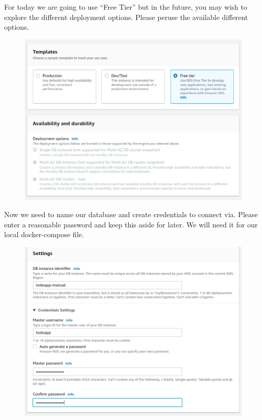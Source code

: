 \documentclass{csse4400}
\begin{document}
For today we are going to use ``Free Tier'' but in the future,
you may wish to explore the different deployment options.
Please peruse the available different options.


\begin{figure}[H]
  \includegraphics[width=\textwidth]{images/db2}
\end{figure}

Now we need to name our database and create credentials to connect via.
Please enter a reasonable password and keep this aside for later.
We will need it for our local docker-compose file.

\begin{figure}[H]
  \includegraphics[width=\textwidth]{images/db3}
\end{figure}
\end{document}
